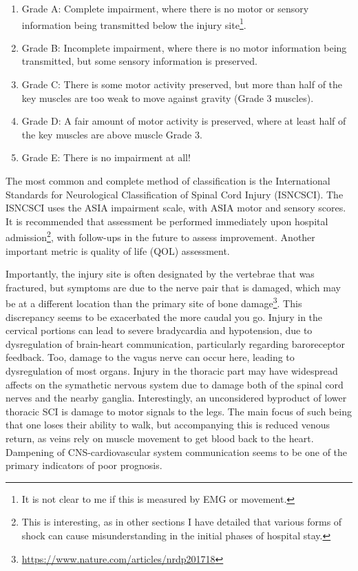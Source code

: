 \begin{enumerate}
    \item Grade A: Complete impairment, where there is no motor or sensory information being transmitted below the injury site\footnote{It is not clear to me if this is measured by EMG or movement.}.
    \item Grade B: Incomplete impairment, where there is no motor information being transmitted, but some sensory information is preserved. 
    \item Grade C: There is some motor activity preserved, but more than half of the key muscles are too weak to move against gravity (Grade 3 muscles). 
    \item Grade D: A fair amount of motor activity is preserved, where at least half of the key muscles are above muscle Grade 3.
    \item Grade E: There is no impairment at all!
\end{enumerate}

The most common and complete method of classification is the International Standards for Neurological Classification of Spinal Cord Injury (ISNCSCI). The ISNCSCI uses the ASIA impairment scale, with ASIA motor and sensory scores. It is recommended that assessment be performed immediately upon hospital admission\footnote{This is interesting, as in other sections I have detailed that various forms of shock can cause misunderstanding in the initial phases of hospital stay.}, with follow-ups in the future to assess improvement. Another important metric is quality of life (QOL) assessment.\newline 

Importantly, the injury site is often designated by the vertebrae that was fractured, but symptoms are due to the nerve pair that is damaged, which may be at a different location than the primary site of bone damage\footnote{\url{https://www.nature.com/articles/nrdp201718}}. This discrepancy seems to be exacerbated the more caudal you go. Injury in the cervical portions can lead to severe bradycardia and hypotension, due to dysregulation of brain-heart communication, particularly regarding baroreceptor feedback. Too, damage to the vagus nerve can occur here, leading to dysregulation of most organs. Injury in the thoracic part may have widespread affects on the symathetic nervous system due to damage both of the spinal cord nerves and the nearby ganglia. Interestingly, an unconsidered byproduct of lower thoracic SCI is damage to motor signals to the legs. The main focus of such being that one loses their ability to walk, but accompanying this is reduced venous return, as veins rely on muscle movement to get blood back to the heart. Dampening of CNS-cardiovascular system communication seems to be one of the primary indicators of poor prognosis.\newline

